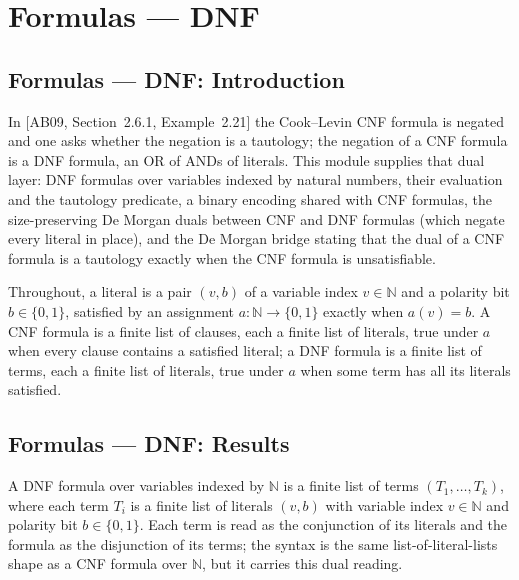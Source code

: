 \section{Formulas --- DNF}
\subsection*{Formulas --- DNF: Introduction}

In [AB09, Section~2.6.1, Example~2.21] the Cook--Levin CNF formula is negated and one asks
whether the negation is a tautology; the negation of a CNF formula is a DNF formula, an OR
of ANDs of literals. This module supplies that dual layer: DNF formulas over variables
indexed by natural numbers, their evaluation and the tautology predicate, a binary
encoding shared with CNF formulas, the size-preserving De Morgan duals between CNF and DNF
formulas (which negate every literal in place), and the De Morgan bridge stating that the
dual of a CNF formula is a tautology exactly when the CNF formula is unsatisfiable.

Throughout, a literal is a pair $(v,b)$ of a variable index $v \in \mathbb{N}$ and a
polarity bit $b \in \{0,1\}$, satisfied by an assignment $a : \mathbb{N} \to \{0,1\}$
exactly when $a(v) = b$. A CNF formula is a finite list of clauses, each a finite list of
literals, true under $a$ when every clause contains a satisfied literal; a DNF formula is a
finite list of terms, each a finite list of literals, true under $a$ when some term has all
its literals satisfied.

\subsection*{Formulas --- DNF: Results}

\begin{definition}
\label{Std.Sat.DNF}
\leanok
A DNF formula over variables indexed by $\mathbb{N}$ is a finite list of terms
$(T_1, \dots, T_k)$, where each term $T_i$ is a finite list of literals $(v, b)$ with
variable index $v \in \mathbb{N}$ and polarity bit $b \in \{0,1\}$. Each term is read as
the conjunction of its literals and the formula as the disjunction of its terms; the
syntax is the same list-of-literal-lists shape as a CNF formula over $\mathbb{N}$, but it
carries this dual reading.
\end{definition}

